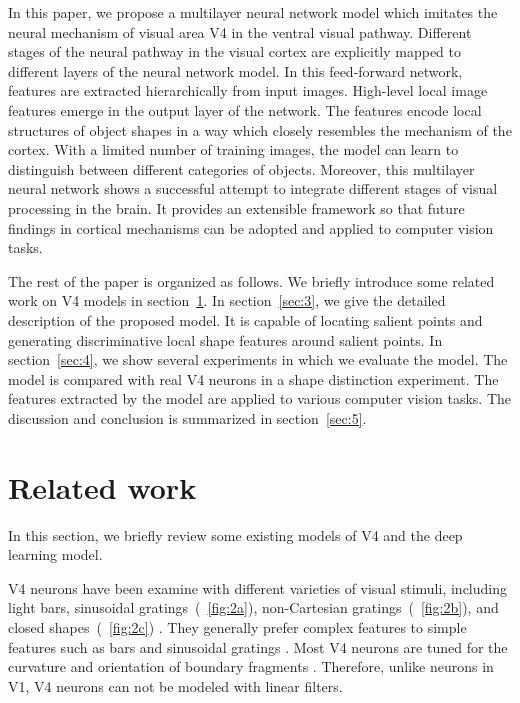\documentclass[twocolumn]{article}
\begin{document}
In this paper, we propose a multilayer neural network model which imitates the neural mechanism of visual area V4 in the ventral visual pathway.
Different stages of the neural pathway in the visual cortex are explicitly mapped to different layers of the neural network model.
In this feed-forward network, features are extracted hierarchically from input images.
High-level local image features emerge in the output layer of the network. 
The features encode local structures of object shapes in a way which closely resembles the mechanism of the cortex.
With a limited number of training images, the model can learn to distinguish between different categories of objects.
Moreover, this multilayer neural network shows a successful attempt to integrate different stages of visual processing in the brain. 
It provides an extensible framework so that future findings in cortical mechanisms can be adopted and applied to computer vision tasks.

The rest of the paper is organized as follows.
We briefly introduce some related work on V4 models in section~\ref{sec:2}.
In section~\ref{sec:3}, we give the detailed description of the proposed model.
It is capable of locating salient points and generating discriminative local shape features around salient points.
In section~\ref{sec:4}, we show several experiments in which we evaluate the model.
The model is compared with real V4 neurons in a shape distinction experiment.
The features extracted by the model are applied to various computer vision tasks.
The discussion and conclusion is summarized in section~\ref{sec:5}.

\section{Related work}\label{sec:2}

In this section, we briefly review some existing models of V4 and the deep learning model.

V4 neurons have been examine with different varieties of visual stimuli, including light bars, sinusoidal gratings~(\figurename~\ref{fig:2a}),
non-Cartesian gratings~(\figurename~\ref{fig:2b}), and closed shapes~(\figurename~\ref{fig:2c}) \cite{gallant1996,pasupathy2001}.
They generally prefer complex features to simple features such as bars and sinusoidal gratings \cite{gallant1996}.
Most V4 neurons are tuned for the curvature and orientation of boundary fragments \cite{pasupathy2001}.
Therefore, unlike neurons in V1, V4 neurons can not be modeled with linear filters.
\end{document}
